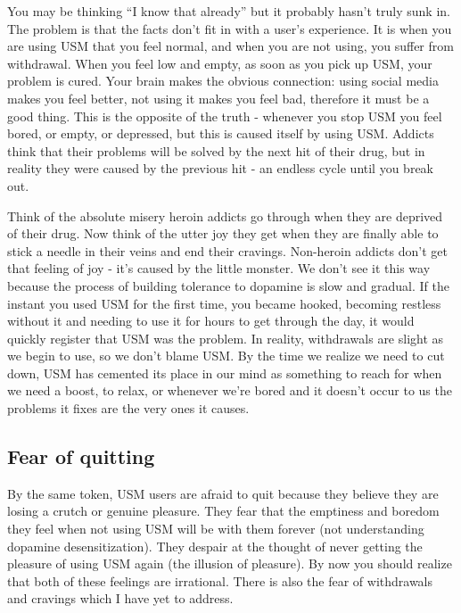 \documentclass[
]{book}
\begin{document}
You may be thinking ``I know that already'' but it probably hasn't truly sunk in. The problem is that the facts don't fit in with a user's experience. It is when you are using USM that you feel normal, and when you are not using, you suffer from withdrawal. When you feel low and empty, as soon as you pick up USM, your problem is cured. Your brain makes the obvious connection: using social media makes you feel better, not using it makes you feel bad, therefore it must be a good thing. This is the opposite of the truth - whenever you stop USM you feel bored, or empty, or depressed, but this is caused itself by using USM. Addicts think that their problems will be solved by the next hit of their drug, but in reality they were caused by the previous hit - an endless cycle until you break out.

Think of the absolute misery heroin addicts go through when they are deprived of their drug. Now think of the utter joy they get when they are finally able to stick a needle in their veins and end their cravings. Non-heroin addicts don't get that feeling of joy - it's caused by the little monster. We don't see it this way because the process of building tolerance to dopamine is slow and gradual. If the instant you used USM for the first time, you became hooked, becoming restless without it and needing to use it for hours to get through the day, it would quickly register that USM was the problem. In reality, withdrawals are slight as we begin to use, so we don't blame USM. By the time we realize we need to cut down, USM has cemented its place in our mind as something to reach for when we need a boost, to relax, or whenever we're bored and it doesn't occur to us the problems it fixes are the very ones it causes.

\subsection{Fear of quitting}\label{fear-of-quitting}

By the same token, USM users are afraid to quit because they believe they are losing a crutch or genuine pleasure. They fear that the emptiness and boredom they feel when not using USM will be with them forever (not understanding dopamine desensitization). They despair at the thought of never getting the pleasure of using USM again (the illusion of pleasure). By now you should realize that both of these feelings are irrational. There is also the fear of withdrawals and cravings which I have yet to address.
\end{document}
